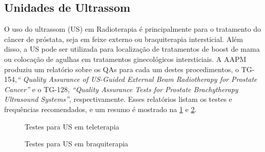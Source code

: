 \documentclass[11pt,a4paper]{article}
\begin{document}
\subsection*{Unidades de Ultrassom}

	O uso do ultrassom (US) em Radioterapia é principalmente para o tratamento do câncer de próstata, seja em feixe externo ou braquiterapia intersticial. Além disso, a US pode ser utilizada para localização de tratamentos de boost de mama ou colocação de agulhas em tratamentos ginecológicos intersticiais. A AAPM produziu um relatório sobre os QAs para cada um destes procedimentos, o TG-154,\textit{`` Quality Assurance of US-Guided External Beam Radiotherapy for Prostate Cancer''} e o TG-128,  \textit{``Quality Assurance Tests for Prostate Brachytherapy Ultrasound Systems''}, respectivamente. Esses relatórios listam os testes e frequências recomendados, e um resumo é mostrado na \ref{fig:qaustele} e \ref{fig:qausbraq}.


	\begin{figure}[!h]
		\centering
		\caption{Testes para US em teleterapia}
		\label{fig:qaustele}
	\end{figure}

	\begin{figure}[!h]
		\centering
		\caption{Testes para US em braquiterapia}
		\label{fig:qausbraq}
	\end{figure}
\end{document}
